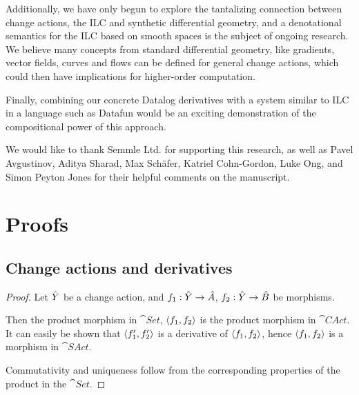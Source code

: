 Additionally, we have only begun to explore the tantalizing connection between
change actions, the ILC and synthetic
differential geometry, and a denotational semantics for the
ILC based on smooth spaces is the subject of ongoing research. We believe many concepts
from standard differential geometry, like gradients, vector fields, curves and flows can
be defined for general change actions, which could then have implications for higher-order
computation.

Finally, combining our concrete Datalog derivatives with a system similar to ILC
in a language such as Datafun would be an exciting demonstration of the compositional
power of this approach.

\begin{acks}

We would like to thank Semmle Ltd. for supporting this research, as well as Pavel
Avgustinov, Aditya Sharad, Max Sch\"afer, Katriel Cohn-Gordon, Luke Ong, and Simon Peyton Jones for their
helpful comments on the manuscript.

\end{acks}

\printbibliography

\clearpage
\appendix
\appendixpage
\section{Proofs}

\subsection{Change actions and derivatives}

\products*
\begin{proof}
  \label{prf:products}
  Let $\hat{Y}$ be a change action, and $f_1: \hat{Y} \rightarrow \hat{A}$, $f_2: \hat{Y}
  \rightarrow \hat{B}$ be morphisms.

  Then the product morphism in $\cat{Set}$, $\left\langle {f_1}, {f_2} \right\rangle$ is the product
  morphism in $\cat{CAct}$. It can easily be
  shown that $\left\langle {f_1'}, {f_2'} \right\rangle$ is a derivative of $\left\langle {f_1}, {f_2} \right\rangle$,
  hence $\left\langle {f_1}, {f_2} \right\rangle$ is a morphism in $\cat{SAct}$.

  Commutativity and uniqueness follow from the corresponding properties of the
  product in the $\cat{Set}$.
\end{proof}


